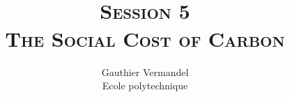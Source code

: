 \documentclass[xcolor=x11names,compress,aspectratio=169]{beamer}%
\begin{document}
%

\title[\SHORTNAME]{
\textsc{\footnotesize\SHORTNAME\\ Session 5\\[0.35em] \Large The Social Cost of Carbon}
\\
}
\author{ Gauthier Vermandel\\
{\footnotesize Ecole polytechnique}}
\date{}%
%

\begin{frame}%
%

\maketitle
%

\transboxout
\end{frame}%
%
\end{document}
